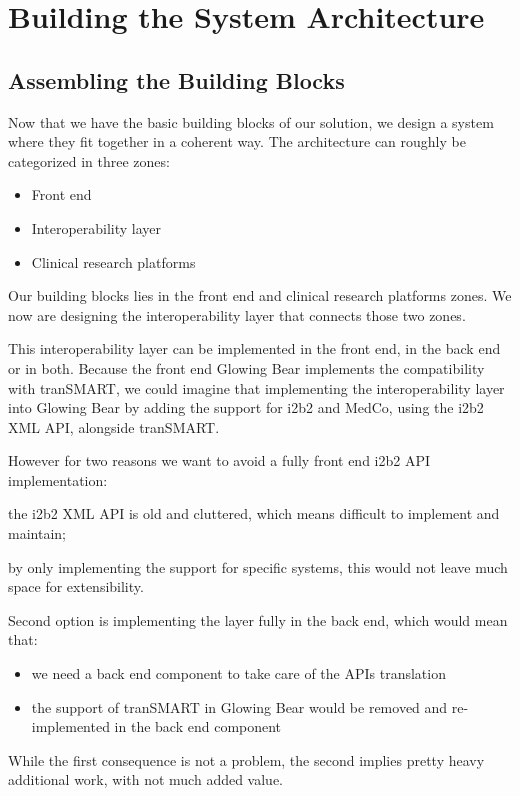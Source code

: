 \section{Building the System Architecture}

\subsection{Assembling the Building Blocks}

Now that we have the basic building blocks of our solution, we design a system where they fit together in a coherent way.
The architecture can roughly be categorized in three zones:
\begin{itemize}
    \item Front end
    \item Interoperability layer
    \item Clinical research platforms
\end{itemize}
Our building blocks lies in the front end and clinical research platforms zones. 
We now are designing the interoperability layer that connects those two zones.

This interoperability layer can be implemented in the front end, in the back end or in both.
Because the front end Glowing Bear implements the compatibility with tranSMART, we could imagine that implementing the interoperability layer into Glowing Bear by adding the support for i2b2 and MedCo, using the i2b2 XML API, alongside tranSMART.

However for two reasons we want to avoid a fully front end i2b2 API implementation: 
\begin{enumerate*}
    \item the i2b2 XML API is old and cluttered, which means difficult to implement and maintain;
    \item by only implementing the support for specific systems, this would not leave much space for extensibility.
\end{enumerate*}

\begin{samepage}
Second option is implementing the layer fully in the back end, which would mean that:
\begin{itemize}
    \item we need a back end component to take care of the APIs translation
    \item the support of tranSMART in Glowing Bear would be removed and re-implemented in the back end component
\end{itemize}
While the first consequence is not a problem, the second implies pretty heavy additional work, with not much added value.
\end{samepage}


